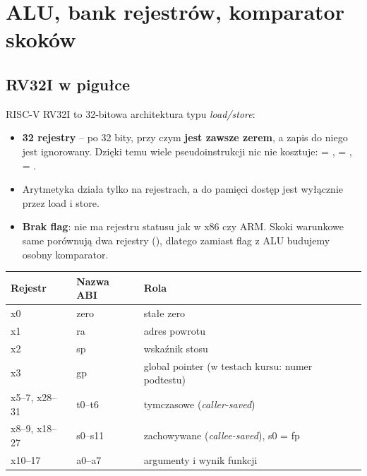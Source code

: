 \chapter{ALU, bank rejestrów, komparator skoków}
\label{ch:alu}


\section{RV32I w pigułce}

RISC-V RV32I to 32-bitowa architektura typu \emph{load/store}:
\begin{itemize}
  \item \textbf{32 rejestry} -- po 32 bity, przy czym
    \textbf{ jest zawsze zerem}, a zapis do niego jest ignorowany.
    Dzięki temu wiele pseudoinstrukcji nic nie kosztuje:
     = ,  = ,
     = .
  \item Arytmetyka działa tylko na rejestrach, a do pamięci dostęp jest
    wyłącznie przez load i store.
  \item \textbf{Brak flag}: nie ma rejestru statusu jak w x86 czy ARM. Skoki
    warunkowe same porównują dwa rejestry (), dlatego
    zamiast flag z ALU budujemy osobny komparator.
\end{itemize}

\begin{center}
\small
\begin{tabular}{@{}lll@{}}
\toprule
\textbf{Rejestr} & \textbf{Nazwa ABI} & \textbf{Rola} \\
\midrule
x0 & zero & stałe zero \\
x1 & ra & adres powrotu \\
x2 & sp & wskaźnik stosu \\
x3 & gp & global pointer (w testach kursu: numer podtestu) \\
x5--7, x28--31 & t0--t6 & tymczasowe (\emph{caller-saved}) \\
x8--9, x18--27 & s0--s11 & zachowywane (\emph{callee-saved}), s0 = fp \\
x10--17 & a0--a7 & argumenty i wynik funkcji \\
\bottomrule
\end{tabular}
\end{center}

